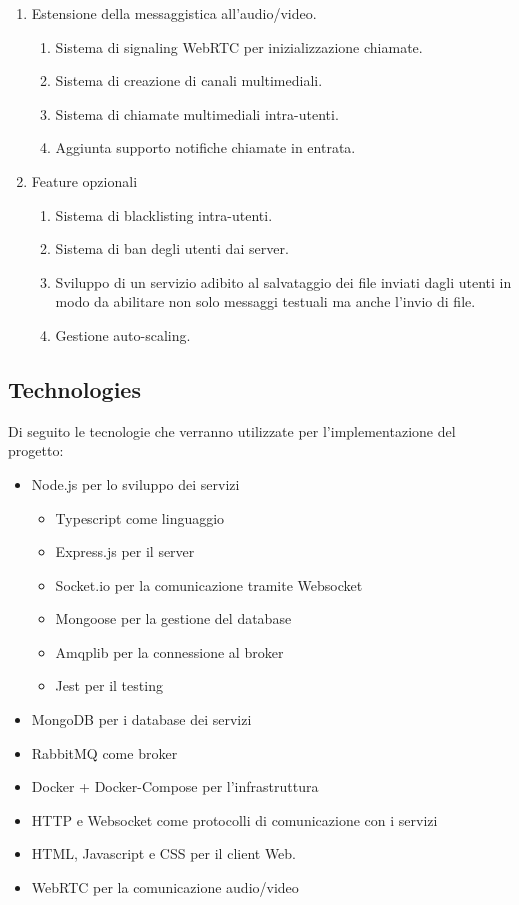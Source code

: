 \begin{enumerate}
    \item Estensione della messaggistica all'audio/video.
    \begin{enumerate}
        \item Sistema di signaling WebRTC per inizializzazione chiamate.
        \item Sistema di creazione di canali multimediali.
        \item Sistema di chiamate multimediali intra-utenti.
        \item Aggiunta supporto notifiche chiamate in entrata.
    \end{enumerate}

    \item Feature opzionali
    \begin{enumerate}
        \item Sistema di blacklisting intra-utenti.
        \item Sistema di ban degli utenti dai server.
        \item Sviluppo di un servizio adibito al salvataggio dei file inviati dagli utenti in modo da abilitare non solo messaggi testuali ma anche l’invio di file.
        \item Gestione auto-scaling.
    \end{enumerate}

\end{enumerate}

\subsection{Technologies}

Di seguito le tecnologie che verranno utilizzate per l'implementazione del progetto:

\begin{itemize}
    \item Node.js per lo sviluppo dei servizi
    \begin{itemize}
        \item Typescript come linguaggio
        \item Express.js per il server
        \item Socket.io per la comunicazione tramite Websocket
        \item Mongoose per la gestione del database
        \item Amqplib per la connessione al broker
        \item Jest per il testing
    \end{itemize}
    \item MongoDB per i database dei servizi
    \item RabbitMQ come broker
    \item Docker + Docker-Compose per l’infrastruttura
    \item HTTP e Websocket come protocolli di comunicazione con i servizi
    \item HTML, Javascript e CSS per il client Web.
    \item WebRTC per la comunicazione audio/video
\end{itemize}
